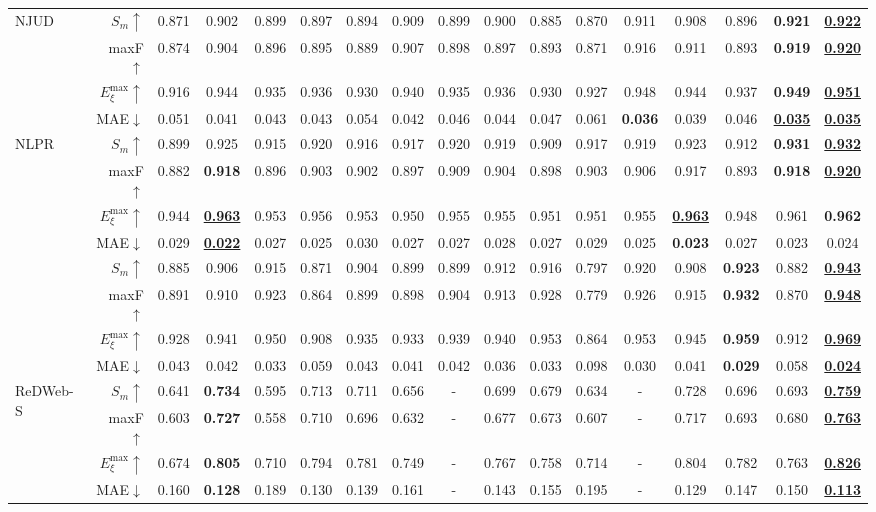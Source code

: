 \documentclass[10pt,twocolumn,letterpaper]{article}
\def\blu#1{\textbf{\color{blue} #1}} \def\red#1{\textbf{\color{red}\underline{#1}}}
\begin{document}
\begin{table*}[t]
\begin{tabular}{lr|cccccccccccccc|c}
  \multirow{4}{*}{NJUD}
    & $S_m\uparrow$   &0.871 &0.902 &0.899 &0.897 &0.894 &0.909 &0.899 &0.900 &0.885 &0.870 &0.911 &0.908 &0.896 &\blu{0.921} &\red{0.922}\\
    & maxF$\uparrow$  &0.874 &0.904 &0.896 &0.895 &0.889 &0.907 &0.898 &0.897 &0.893 &0.871 &0.916 &0.911 &0.893 &\blu{0.919} &\red{0.920} \\
    & $E_{\xi}^{\text{max}}\uparrow$ &0.916 &0.944 &0.935 &0.936 &0.930 &0.940 &0.935 &0.936 &0.930 &0.927 &0.948 &0.944 &0.937 &\blu{0.949} &\red{0.951}\\
  \cite{ju2014njud}& MAE$\downarrow$ &0.051 &0.041 &0.043 &0.043 &0.054 &0.042 &0.046 &0.044 &0.047 &0.061 &\blu{0.036} &0.039 &0.046 &\red{0.035} &\red{0.035} \\
     \hline
  \multirow{4}{*}{NLPR}
    & $S_m\uparrow$   &0.899 &0.925 &0.915 &0.920 &0.916 &0.917 &0.920 &0.919 &0.909 &0.917 &0.919 &0.923 &0.912 &\blu{0.931} &\red{0.932}\\
    & maxF$\uparrow$  &0.882 &\blu{0.918} &0.896 &0.903 &0.902 &0.897 &0.909 &0.904 &0.898 &0.903 &0.906 &0.917 &0.893 &\blu{0.918} &\red{0.920}\\
    & $E_{\xi}^{\text{max}}\uparrow$ &0.944 &\red{0.963} &0.953 &0.956 &0.953 &0.950 &0.955 &0.955 &0.951 &0.951 &0.955 &\red{0.963} &0.948 &0.961 &\blu{0.962}\\
   \cite{peng2014nlpr}& MAE$\downarrow$ &0.029 &\red{0.022} &0.027 &0.025 &0.030 &0.027 &0.027 &0.028 &0.027 &0.029 &0.025 &\blu{0.023} &0.027 &0.023 &0.024\\
     \hline
  \multirow{4}{*}{}
    & $S_m\uparrow$  &0.885 &0.906 &0.915 &0.871 &0.904 &0.899 &0.899 &0.912 &0.916 &0.797 &0.920 &0.908 &\blu{0.923} &0.882 &\red{0.943}\\
    DUTLF& maxF$\uparrow$ &0.891 &0.910 &0.923 &0.864 &0.899 &0.898 &0.904 &0.913 &0.928 &0.779 &0.926 &0.915 &\blu{0.932} &0.870 &\red{0.948}\\
    -Depth& $E_{\xi}^{\text{max}}\uparrow$  &0.928 &0.941 &0.950 &0.908 &0.935 &0.933 &0.939 &0.940 &0.953 &0.864 &0.953 &0.945 &\blu{0.959} &0.912 &\red{0.969}\\
     \cite{Piao2019dmra}& MAE$\downarrow$ &0.043 &0.042 &0.033 &0.059 &0.043 &0.041 &0.042 &0.036 &0.033 &0.098 &0.030 &0.041 &\blu{0.029} &0.058 &\red{0.024}\\
     \hline
  \multirow{4}{*}{ReDWeb-S}
    & $S_m\uparrow$   &0.641 &\blu{0.734} &0.595 &0.713 &0.711 &0.656 &-	 &0.699 &0.679 &0.634 &- &0.728 &0.696 &0.693 &\red{0.759}\\
    & maxF$\uparrow$   &0.603 &\blu{0.727} &0.558 &0.710 &0.696 &0.632 &- &0.677 &0.673 &0.607 &- &0.717 &0.693 &0.680 &\red{0.763}\\
    & $E_{\xi}^{\text{max}}\uparrow$  &0.674 &\blu{0.805} &0.710 &0.794 &0.781 &0.749 &- &0.767 &0.758 &0.714 &- &0.804 &0.782 &0.763 &\red{0.826}\\
    \cite{liu2020ReDWeb-S}& MAE$\downarrow$  &0.160 &\blu{0.128} &0.189 &0.130 &0.139 &0.161 &- &0.143 &0.155 &0.195 &- &0.129 &0.147 &0.150 &\red{0.113}\\
     \hline


\end{tabular}
\end{table*}
\end{document}
